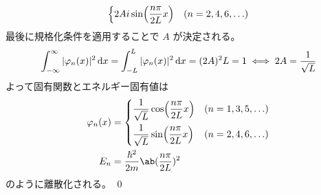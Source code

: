 \documentclass[uplatex,dvipdfmx,a4paper,11pt]{jlreq}
\makeatletter
\numberwithin{equation}{section}
\theoremstyle{definition}
\renewenvironment{proof}[1][\proofname]{\par
  \normalfont
  \topsep6\p@\@plus6\p@ \trivlist
  \item[\hskip\labelsep{\bfseries #1}\@addpunct{\bfseries}]\ignorespaces\quad\par
}{%
  \qed\endtrivlist\@endpefalse
}
\renewcommand\proofname{証明}
\makeatother
\begin{document}
\begin{proof}
\begin{align}
\begin{dcases}
                                              2Ai\sin(\frac{n\pi}{2L}x) & (n = 2,4,6,\ldots)
                                            \end{dcases}
  \end{align}
  最後に規格化条件を適用することで $A$ が決定される。
  \begin{align}
    \int_{-\infty}^\infty |\varphi_n(x)|^2\dl{x} = \int_{-L}^L |\varphi_n(x)|^2\dl{x} = (2A)^2L = 1 \iff 2A = \frac{1}{\sqrt{L}}
  \end{align}
  よって固有関数とエネルギー固有値は
  \begin{align}
    \varphi_n(x) & = \begin{dcases}
                       \frac{1}{\sqrt{L}}\cos(\frac{n\pi}{2L}x) & (n = 1,3,5,\ldots) \\
                       \frac{1}{\sqrt{L}}\sin(\frac{n\pi}{2L}x) & (n = 2,4,6,\ldots)
                     \end{dcases} \\
    E_n          & = \frac{\hbar^2}{2m}\ab(\frac{n\pi}{2L})^2
  \end{align}
  のように離散化される。
\end{proof}
\end{document}
